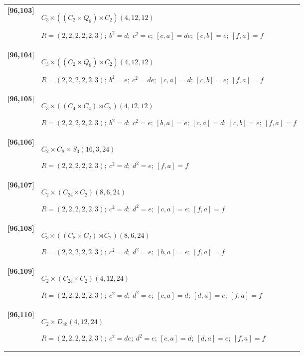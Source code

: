 \documentclass[UTF8,fontset=fandol,11pt,a4paper]{ctexart}
\begin{document}
\begin{longtable}{@{}p{17mm}>{\raggedright\arraybackslash}p{141mm}@{}}
\textbf{[96,103]} & $C_{3}\rtimes ((C_{2}\times Q_{8})\rtimes C_{2})$\quad $(4,12,12)$\par\(R=(2,2,2,2,2,3);\allowbreak\ b^{2}=d;\allowbreak\ c^{2}=e;\allowbreak\ [c,a]=de;\allowbreak\ [c,b]=e;\allowbreak\ [f,a]=f\)\\[3pt]

\textbf{[96,104]} & $C_{3}\rtimes ((C_{2}\times Q_{8})\rtimes C_{2})$\quad $(4,12,12)$\par\(R=(2,2,2,2,2,3);\allowbreak\ b^{2}=e;\allowbreak\ c^{2}=de;\allowbreak\ [c,a]=d;\allowbreak\ [c,b]=e;\allowbreak\ [f,a]=f\)\\[3pt]

\textbf{[96,105]} & $C_{3}\rtimes ((C_{4}\times C_{4})\rtimes C_{2})$\quad $(4,12,12)$\par\(R=(2,2,2,2,2,3);\allowbreak\ b^{2}=d;\allowbreak\ c^{2}=e;\allowbreak\ [b,a]=e;\allowbreak\ [c,a]=d;\allowbreak\ [c,b]=e;\allowbreak\ [f,a]=f\)\\[3pt]

\textbf{[96,106]} & $C_{2}\times C_{8}\times S_{3}$\quad $(16,3,24)$\par\(R=(2,2,2,2,2,3);\allowbreak\ c^{2}=d;\allowbreak\ d^{2}=e;\allowbreak\ [f,a]=f\)\\[3pt]

\textbf{[96,107]} & $C_{2}\times (C_{24}\rtimes C_{2})$\quad $(8,6,24)$\par\(R=(2,2,2,2,2,3);\allowbreak\ c^{2}=d;\allowbreak\ d^{2}=e;\allowbreak\ [c,a]=e;\allowbreak\ [f,a]=f\)\\[3pt]

\textbf{[96,108]} & $C_{3}\rtimes ((C_{8}\times C_{2})\rtimes C_{2})$\quad $(8,6,24)$\par\(R=(2,2,2,2,2,3);\allowbreak\ c^{2}=d;\allowbreak\ d^{2}=e;\allowbreak\ [b,a]=e;\allowbreak\ [f,a]=f\)\\[3pt]

\textbf{[96,109]} & $C_{2}\times (C_{24}\rtimes C_{2})$\quad $(4,12,24)$\par\(R=(2,2,2,2,2,3);\allowbreak\ c^{2}=d;\allowbreak\ d^{2}=e;\allowbreak\ [c,a]=d;\allowbreak\ [d,a]=e;\allowbreak\ [f,a]=f\)\\[3pt]

\textbf{[96,110]} & $C_{2}\times D_{48}$\quad $(4,12,24)$\par\(R=(2,2,2,2,2,3);\allowbreak\ c^{2}=de;\allowbreak\ d^{2}=e;\allowbreak\ [c,a]=d;\allowbreak\ [d,a]=e;\allowbreak\ [f,a]=f\)\\[3pt]


\end{longtable}
\end{document}
